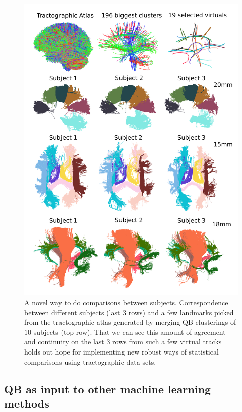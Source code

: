 \documentclass[preprint,authoryear,a4paper,10pt,onecolumn]{elsarticle}
\begin{document}
%
\begin{figure}
\begin{centering}
\includegraphics[scale=0.7]{last_figures/close_distance}
\par\end{centering}
\caption{A novel way to do comparisons between subjects. Correspondence
  between different subjects (last $3$ rows) and a few landmarks picked
  from the tractographic atlas generated by merging QB clusterings of
  $10$ subjects (top row). That we can see this amount of agreement and
  continuity on the last $3$ rows from such a few virtual tracks holds
  out hope for implementing new robust ways of statistical comparisons
  using tractographic data sets.\label{Flo:CloseToSelected}}
\end{figure}

\subsection{QB as input to other machine learning methods}
\end{document}
